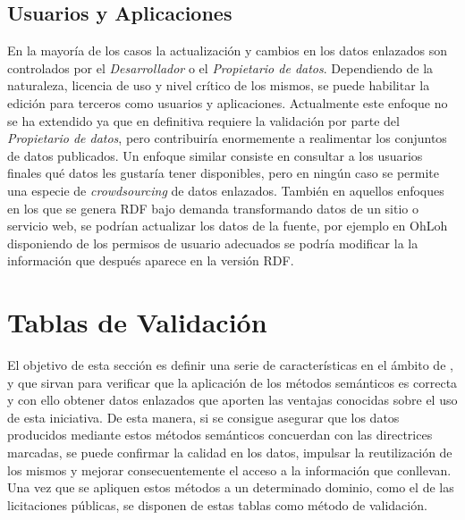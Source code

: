 \subsection{Usuarios y Aplicaciones}
En la mayoría de los casos la actualización y cambios en los datos enlazados son controlados
por el \textit{Desarrollador} o el \textit{Propietario de datos}. Dependiendo de la naturaleza, licencia
de uso y nivel crítico de los mismos, se puede habilitar la edición para terceros como 
usuarios y aplicaciones. Actualmente este enfoque no se ha extendido ya que en definitiva 
requiere la validación por parte del \textit{Propietario de datos}, pero contribuiría enormemente 
a realimentar los conjuntos de datos publicados. Un enfoque similar consiste en consultar a los usuarios finales qué datos les gustaría
tener disponibles, pero en ningún caso se permite una especie de \textit{crowdsourcing} de datos
enlazados. También en aquellos enfoques en los que se genera \gls{RDF} bajo demanda transformando
datos de un sitio o servicio web, se podrían actualizar los datos de la fuente, por ejemplo
en OhLoh disponiendo de los permisos de usuario adecuados se podría modificar la la información 
que después aparece en la versión RDF.

\section{Tablas de Validación}\label{sect:tablas-validacion}
El objetivo de esta sección es definir una serie de características 
en el ámbito de \linkeddata, \opendata y \lod que sirvan para verificar que
la aplicación de los métodos semánticos es correcta y con ello obtener
datos enlazados que aporten las ventajas conocidas sobre el uso
de esta iniciativa. De esta manera, si se consigue asegurar que los datos
producidos mediante estos métodos semánticos concuerdan con las directrices marcadas, se puede confirmar la calidad en los datos, impulsar la reutilización de los mismos y
mejorar consecuentemente el acceso a la información que conllevan. Una vez
que se apliquen estos métodos a un determinado dominio, como el de las licitaciones públicas, se disponen de estas tablas como método de validación. 


